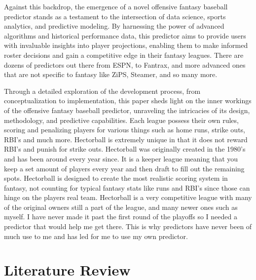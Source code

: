 \documentclass[12pt, english]{article}
\begin{document}
Against this backdrop, the emergence of a novel offensive fantasy baseball predictor stands as a testament to the intersection of data science, sports analytics, and predictive modeling. By harnessing the power of advanced algorithms and historical performance data, this predictor aims to provide users with invaluable insights into player projections, enabling them to make informed roster decisions and gain a competitive edge in their fantasy leagues. There are dozens of predictors out there from ESPN, to Fantrax, and more advanced ones that are not specific to fantasy like ZiPS, Steamer, and so many more.

Through a detailed exploration of the development process, from conceptualization to implementation, this paper sheds light on the inner workings of the offensive fantasy baseball predictor, unraveling the intricacies of its design, methodology, and predictive capabilities. 
Each league possess their own rules, scoring and penalizing players for various things such as home runs, strike outs, RBI's and much more. Hectorball is extremely unique in that it does not reward RBI's and punish for strike outs. Hectorball was originally created in the 1980's and has been around every year since. It is a keeper league meaning that you keep a set amount of players every year and then draft to fill out the remaining spots. Hectorball is designed to create the most realistic scoring system in fantasy, not counting for typical fantasy stats like runs and RBI's since those can hinge on the players real team. Hectorball is a very competitive league with many of the original owners still a part of the league, and many newer ones such as myself. I have never made it past the first round of the playoffs so I needed a predictor that would help me get there.  This is why predictors have never been of much use to me and has led for me to use my own predictor.



\section{Literature Review}
\end{document}
